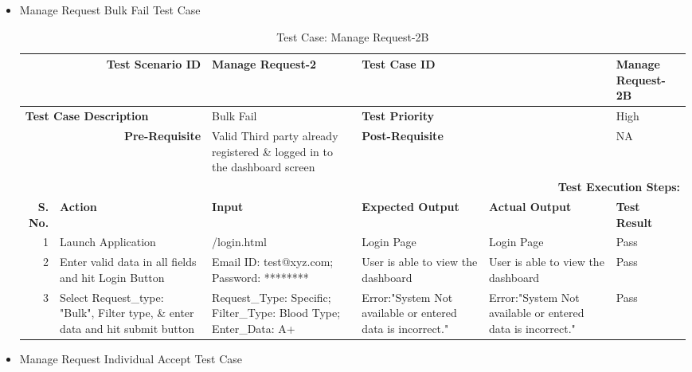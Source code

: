 \documentclass[a4paper, hidelinks, 12pt]{report}
\begin{document}
\begin{itemize}
\item{Manage Request Bulk Fail Test Case}
\begin{table}[H]
  \centering
  \caption{Test Case: Manage Request-2B}
    \begin{tabular}{|r|p{4.355em}|p{7.715em}|p{6.43em}|p{5.855em}|p{5.07em}|}
    \toprule
    \multicolumn{2}{|p{13.425em}|}{\textbf{Test Scenario ID}} & Manage Request-2 & \multicolumn{2}{p{12.285em}|}{\textbf{Test Case ID}} & Manage Request-2B \\
    \midrule
    \multicolumn{2}{|l|}{\multirow{2}[2]{*}{\textbf{Test Case Description}}} & \multirow{2}[2]{*}{Bulk Fail} & \multicolumn{2}{l|}{\multirow{2}[2]{*}{\textbf{Test Priority}}} & \multirow{2}[2]{*}{High} \\
    \multicolumn{2}{|l|}{} & \multicolumn{1}{l|}{} & \multicolumn{2}{l|}{} & \multicolumn{1}{l|}{} \\
    \midrule
    \multicolumn{2}{|p{13.425em}|}{\textbf{Pre-Requisite}} & Valid Third party already registered \& logged in to the dashboard screen & \multicolumn{2}{p{12.285em}|}{\textbf{Post-Requisite}} & NA \\
    \midrule
    \multicolumn{6}{p{38.495em}|}{\textbf{Test Execution Steps:}} \\
    \midrule
    \multicolumn{1}{|p{5.07em}|}{\textbf{S. No.}} & \textbf{Action } & \textbf{Input} & \textbf{Expected Output} & \textbf{Actual Output} & \textbf{Test Result} \\
    \midrule
    1     & Launch Application & /login.html & Login Page & Login Page & Pass \\
    \midrule
    2     & Enter valid data in all fields and hit Login Button & Email ID: test@xyz.com; Password: ******** & User is able to view the dashboard & User is able to view the dashboard & Pass \\
    \midrule
    3     & Select Request\_type: "Bulk", Filter type, \& enter data and hit submit button & Request\_Type: Specific; Filter\_Type: Blood Type; Enter\_Data: A+ & Error:"System Not available or entered data is incorrect." & Error:"System Not available or entered data is incorrect." & Pass \\
    \bottomrule
    \end{tabular}%
  \label{tab:Test Case: Manage Request-2B}%
\end{table}%
\item{Manage Request Individual Accept Test Case}

\end{itemize}
\end{document}
